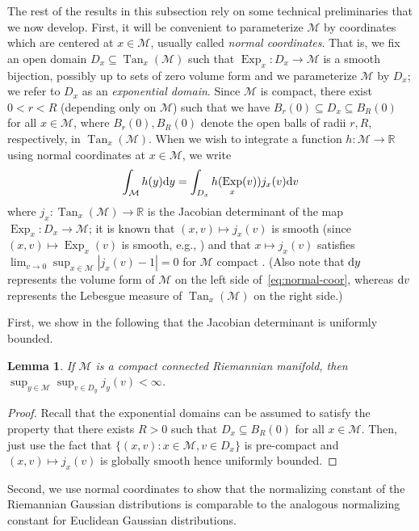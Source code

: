 \documentclass[preprint]{imsart}
\theoremstyle{plain}
\newtheorem{lemma}[theorem]{Lemma}
\theoremstyle{definition}
\newcommand{\Rbb}{\mathbb{R}}
\newcommand{\Mcal}{\mathcal{M}}
\newcommand{\diff}{\textnormal{d}}
\DeclareMathOperator{\Tan}{Tan}
\DeclareMathOperator{\Exp}{Exp}
\begin{document}
\begin{appendix}
The rest of the results in this subsection rely on some technical preliminaries that we now develop.
First, it will be convenient to parameterize $\Mcal$ by coordinates which are centered at $x\in\Mcal$, usually called \textit{normal coordinates}.
That is, we fix an open domain $D_x\subseteq \Tan_x(\Mcal)$ such that $\Exp_x:D_x\to\Mcal$ is a smooth bijection, possibly up to sets of zero volume form and we parameterize $\Mcal$ by $D_x$; we refer to $D_x$ as an \textit{exponential domain}.
Since $\Mcal$ is compact, there exist $0<r<R$ (depending only on $\Mcal$) such that we have $B_r(0) \subseteq D_x \subseteq B_R(0)$ for all $x\in\Mcal$, where $B_r(0),B_R(0)$ denote the open balls of radii $r,R$, respectively, in $\Tan_x(\Mcal)$.
When we wish to integrate a function $h:\Mcal\to\Rbb$ using normal coordinates at $x\in\Mcal$, we write
\begin{equation}\label{eq:normal-coor}
    \int_{\Mcal}h(y)\diff y = \int_{D_x }h(\Exp_x(v))j_x(v)\diff v
\end{equation}
where $j_x: \Tan_x(\Mcal)\to\Rbb$ is the Jacobian determinant of the map $\Exp_x:D_x\to\Mcal$; it is known that $(x,v)\mapsto j_x(v)$ is smooth (since $(x,v)\mapsto \Exp_x(v)$ is smooth, e.g., \cite[Chapter~5.5.1]{Petersen}) and that $x\mapsto j_x(v)$ satisfies $\lim_{v\to 0}\sup_{x\in \Mcal}|j_x(v) - 1| = 0$ for $\Mcal$ compact \cite[Appendix~B]{PennecRiemNorm}.
(Also note that $\diff y$ represents the volume form of $\Mcal$ on the left side of~\eqref{eq:normal-coor}, whereas $\diff v$ represents the Lebesgue measure of $\Tan_x(\Mcal)$ on the right side.)

First, we show in the following that the Jacobian determinant is uniformly bounded.

\begin{lemma}\label{lem:jac-det-bdd}
If $\Mcal$ is a compact connected Riemannian manifold, then
$\sup_{y\in\Mcal}\sup_{v\in D_y} j_y(v)<\infty$.
\end{lemma}

\begin{proof}
    Recall that the exponential domains can be assumed to satisfy the property that there exists $R>0$ such that $D_x\subseteq B_R(0)$ for all $x\in \Mcal$.
    Then, just use the fact that $\{(x,v): x\in \Mcal, v\in D_x\}$ is pre-compact and $(x,v)\mapsto j_x(v)$ is globally smooth hence uniformly bounded.
\end{proof}

Second, we use normal coordinates to show that the normalizing constant of the Riemannian Gaussian distributions is comparable to the analogous normalizing constant for Euclidean Gaussian distributions.


\end{appendix}
\end{document}

